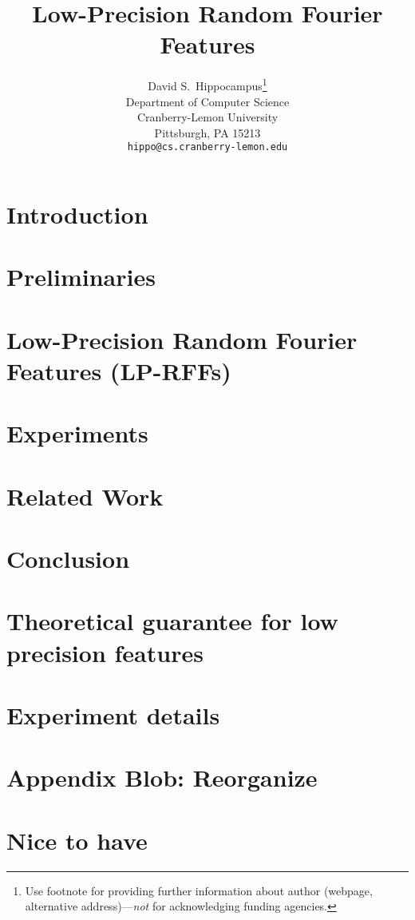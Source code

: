 \documentclass{article}
\title{Low-Precision Random Fourier Features}
\author{
  David S.~Hippocampus\thanks{Use footnote for providing further
    information about author (webpage, alternative
    address)---\emph{not} for acknowledging funding agencies.} \\
  Department of Computer Science\\
  Cranberry-Lemon University\\
  Pittsburgh, PA 15213 \\
  \texttt{hippo@cs.cranberry-lemon.edu} \\
}
\begin{document}

\maketitle

\begin{abstract}

\end{abstract}

\section{Introduction}
\label{sec:intro}


\section{Preliminaries}
\label{sec:prelim}


\section{Low-Precision Random Fourier Features (LP-RFFs)}
\label{sec:lprff}


\section{Experiments}
\label{sec:experiments}


\section{Related Work}
\label{sec:relwork}


\section{Conclusion}
\label{sec:conclusion}




%

%

\clearpage

\appendix

\section{Theoretical guarantee for low precision features}
\label{sec:lprff_theory_appendix}


\section{Experiment details}
\label{sec:exp_details}


\section{Appendix Blob: Reorganize}
\label{sec:appendix_blob}




\section{Nice to have}
\label{sec:nicetohave}

\end{document}
